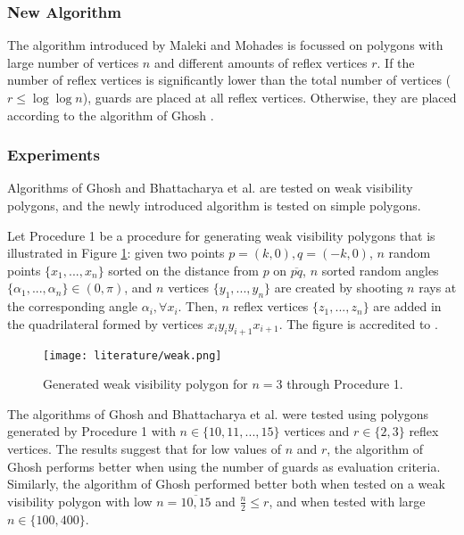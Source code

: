\newpage
\subsubsection{New Algorithm}
The algorithm introduced by Maleki and Mohades is focussed on polygons with large number of vertices $n$ and different amounts of reflex vertices $r$. If the number of reflex vertices is significantly lower than the total number of vertices ($r \leq \log \log n$), guards are placed at all reflex vertices. Otherwise, they are placed according to the algorithm of Ghosh \cite{GHOSH2010718}.

\subsubsection{Experiments}
Algorithms of Ghosh \cite{GHOSH2010718} and Bhattacharya et al. \cite{bhattacharya2016approximability} are tested on weak visibility polygons, and the newly introduced algorithm is tested on simple polygons. 

Let Procedure 1 be a procedure for generating weak visibility polygons that is illustrated in Figure \ref{fig:weak}: given two points $p = (k, 0), q = (-k, 0)$,  $n$ random points $\{x_1, ..., x_n\}$ sorted on the distance from $p$ on $\overline{pq}$, $n$ sorted random angles $\{\alpha_1, ..., \alpha_n\} \in  (0, \pi)$, and $n$ vertices $\{y_1, ..., y_n\}$ are created by shooting $n$ rays at the corresponding angle $\alpha_i, \forall x_i$. Then, $n$ reflex vertices $\{z_1, ..., z_n\}$ are added in the quadrilateral formed by vertices $x_iy_iy_{i + 1}x_{i + 1}$. The figure is accredited to \cite{maleki2022implementation}.

\begin{figure}[h!]
    \centering
    \texttt{[image: literature/weak.png]}
    \caption{Generated weak visibility polygon for $n = 3$ \cite{maleki2022implementation} through Procedure 1.}
    \label{fig:weak}
\end{figure}

The algorithms of Ghosh \cite{GHOSH2010718} and Bhattacharya et al. \cite{bhattacharya2016approximability} were tested using polygons generated by Procedure 1 with $n \in \{10, 11, ..., 15\}$ vertices and $r \in \{2, 3\}$ reflex vertices. The results suggest that for low values of $n$ and $r$, the algorithm of Ghosh \cite{GHOSH2010718} performs better when using the number of guards as evaluation criteria. 
Similarly, the algorithm of Ghosh \cite{GHOSH2010718} performed better both when tested on a weak visibility polygon with low $n = \overline{10, 15}$ and $\frac n 2 \leq r$, and when tested with large $n \in \{100, 400\}$.


